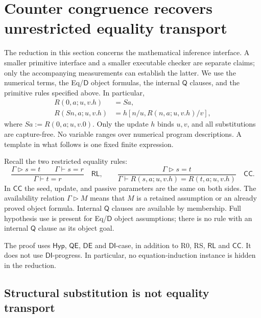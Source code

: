 \documentclass[11pt,letterpaper]{article}
\theoremstyle{definition}\newtheorem{definition}[theorem]{Definition}
\theoremstyle{remark}\newtheorem{remark}[theorem]{Remark}
\begin{document}

\section{Counter congruence recovers unrestricted equality transport}
\label{ctr:section}

The reduction in this section concerns the mathematical inference
interface. A smaller primitive interface and a smaller executable checker
are separate claims; only the accompanying measurements can establish
the latter. We use the numerical terms, the Eq/$\mathsf D$ object
formulas, the internal $\mathsf Q$ clauses, and the primitive rules
specified above. In particular,
\[
 \begin{aligned}
 R(0,a;u,v.h)&=Sa,\\
 R(Sn,a;u,v.h)&=h[n/u,R(n,a;u,v.h)/v],
 \end{aligned}
 \tag{R0, RS}
\]
where $Sa:=R(0,a;u,v.0)$.
Only the update $h$ binds $u,v$, and all substitutions are capture-free.
No variable ranges over numerical program descriptions. A template in
what follows is one fixed finite expression.

Recall the two restricted equality rules:
\[
 \frac{\Gamma\mathrel{\triangleright}s=t\qquad
       \Gamma\vdash s=r}
      {\Gamma\vdash t=r}
 \quad\mathsf{RL},
 \qquad
 \frac{\Gamma\mathrel{\triangleright}s=t}
      {\Gamma\vdash R(s,a;u,v.h)=R(t,a;u,v.h)}
 \quad\mathsf{CC}.
 \tag{Root and counter}
\]
In $\mathsf{CC}$ the seed, update, and passive parameters are the same
on both sides. The availability relation $\Gamma\mathrel{\triangleright}M$
means that $M$ is a retained assumption or an already proved object
formula. Internal $\mathsf Q$ clauses are available by membership.
Full hypothesis use is present for Eq/$\mathsf D$ object assumptions;
there is no rule with an internal $\mathsf Q$ clause as its object goal.

The proof uses $\mathsf{Hyp}$, $\mathsf{QE}$, $\mathsf{DE}$ and
$\mathsf{DI}$-case, in addition to R0, RS, $\mathsf{RL}$ and
$\mathsf{CC}$. It does not use $\mathsf{DI}$-progress. In particular,
no equation-induction instance is hidden in the reduction.

\subsection{Structural substitution is not equality transport}
\end{document}
